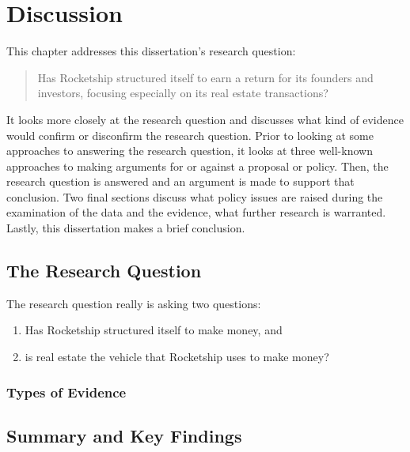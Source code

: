 
\chapter{Discussion}%
\label{ch:discussion}%
\noindent\bigskip%

This chapter addresses this dissertation's research question:
\medskip%
\begin{quote}\OnehalfSpacing
  Has Rocketship structured itself to earn a return for its founders and investors, focusing especially on its real estate transactions?
\end{quote}
It looks more closely at the research question and discusses what kind of evidence would confirm or disconfirm the research question. Prior to looking at some approaches to answering the research question, it looks at three well-known approaches to making arguments for or against a proposal or policy. Then, the research question is answered and an argument is made to support that conclusion. Two final sections discuss what policy issues are raised during the examination of the data and the evidence, what further research is warranted. Lastly, this dissertation makes a brief conclusion.

\section{The Research Question}%
\label{sec:research-question}\indent%

The research question really is asking two questions:
\begin{enumerate}
  \item Has Rocketship structured itself to make money, and
  \item is real estate the vehicle that Rocketship uses to make money?
\end{enumerate}

\subsection{Types of Evidence}%
\label{sec:types-evidence}\indent%

\section{Summary and Key Findings}%
\label{sec:summary-key-findings}\indent%

